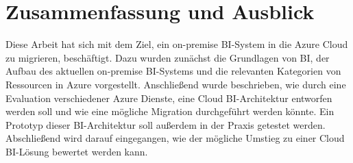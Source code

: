 \chapter{Zusammenfassung und Ausblick}
\label{ch:zusammenfassung}
Diese Arbeit hat sich mit dem Ziel, ein on-premise BI-System in die Azure Cloud zu migrieren, beschäftigt. Dazu wurden zunächst die Grundlagen von BI, der Aufbau des aktuellen on-premise BI-Systems und die relevanten Kategorien von Ressourcen in Azure vorgestellt. Anschließend wurde beschrieben, wie durch eine Evaluation verschiedener Azure Dienste, eine Cloud BI-Architektur entworfen werden soll und wie eine mögliche Migration durchgeführt werden könnte. Ein Prototyp dieser BI-Architektur soll außerdem in der Praxis getestet werden. Abschließend wird darauf eingegangen, wie der mögliche Umstieg zu einer Cloud BI-Lösung bewertet werden kann.